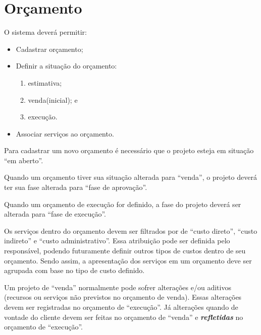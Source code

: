 \chapter{Orçamento}

O sistema deverá permitir:

\begin{itemize}
	\item Cadastrar orçamento;
	\item Definir a situação do orçamento:
	\begin{enumerate}
		\item estimativa;
		\item venda(inicial); e
		\item execução.
	\end{enumerate}
	\item Associar serviços ao orçamento.
\end{itemize}

Para cadastrar um novo orçamento é necessário que o projeto esteja em situação ``em aberto''.

Quando um orçamento tiver sua situação alterada para ``venda'', o projeto deverá ter sua fase alterada para ``fase de aprovação''.

Quando um orçamento de execução for definido, a fase do projeto deverá ser alterada para ``fase de execução''.

Os serviços dentro do orçamento devem ser filtrados por de ``custo direto'', ``custo indireto'' e ``custo administrativo''. Essa atribuição pode ser definida pelo responsável, podendo futuramente definir outros tipos de custos dentro de seu orçamento. Sendo assim, a apresentação dos serviços em um orçamento deve ser agrupada com base no tipo de custo definido.

Um projeto de ``venda'' normalmente pode sofrer alterações e/ou aditivos (recursos ou serviços não previstos no orçamento de venda). Essas alterações devem ser registradas no orçamento de ``execução''. Já alterações quando de vontade do cliente devem ser feitas no orçamento de ``venda'' e \emph{\textbf{refletidas}} no orçamento de ``execução''.
